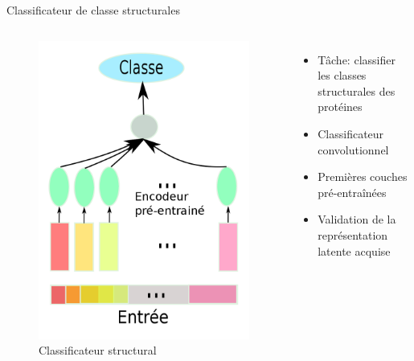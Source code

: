 \documentclass{beamer}
\begin{document}
\begin{frame}{Classificateur de classe structurales}

  \begin{columns}
    \begin{figure}
      \centering
      \includegraphics[scale=0.135]{../Figures/Class}
      \caption{Classificateur structural}
    \end{figure}

    \begin{itemize}
    \item Tâche: classifier les classes structurales des protéines\pause
    \item Classificateur convolutionnel\pause
    \item Premières couches pré-entraînées\pause
    \item Validation de la représentation latente acquise
    \end{itemize}
  \end{columns}

 \end{frame}
\end{document}
